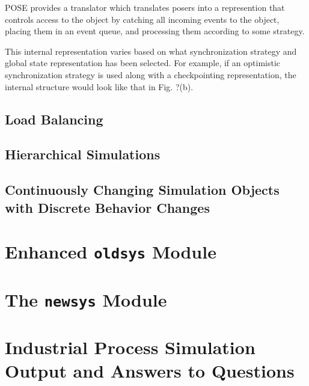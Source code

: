 \documentclass[10pt]{article}
\begin{document}
POSE provides a translator which translates posers into a represention
that controls access to the object by catching all incoming events to
the object, placing them in an event queue, and processing them
according to some strategy.

This internal representation varies based on what synchronization
strategy and global state representation has been selected.  For
example, if an optimistic synchronization strategy is used along with a
checkpointing representation, the internal structure would look like
that in Fig. ?(b).

\subsection{Load Balancing}

\subsection{Hierarchical Simulations}

\subsection{Continuously Changing Simulation Objects with Discrete
Behavior Changes}

\appendix

\section{Enhanced {\tt oldsys} Module}

\section{The {\tt newsys} Module}

\section{Industrial Process Simulation Output and Answers to Questions} 
\end{document}
